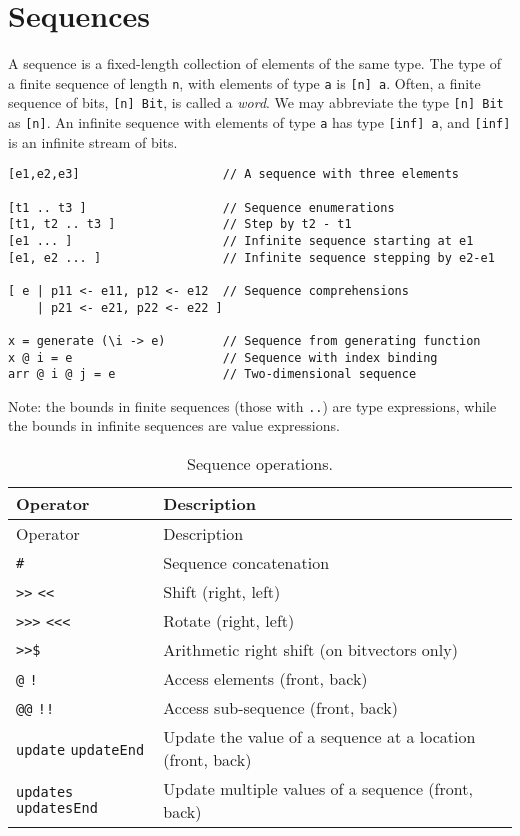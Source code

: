 \hypertarget{sequences}{%
\section{Sequences}\label{sequences}}

A sequence is a fixed-length collection of elements of the same type.
The type of a finite sequence of length \texttt{n}, with elements of
type \texttt{a} is \texttt{{[}n{]}\ a}. Often, a finite sequence of
bits, \texttt{{[}n{]}\ Bit}, is called a \emph{word}. We may abbreviate
the type \texttt{{[}n{]}\ Bit} as \texttt{{[}n{]}}. An infinite sequence
with elements of type \texttt{a} has type \texttt{{[}inf{]}\ a}, and
\texttt{{[}inf{]}} is an infinite stream of bits.

\begin{verbatim}
[e1,e2,e3]                    // A sequence with three elements

[t1 .. t3 ]                   // Sequence enumerations
[t1, t2 .. t3 ]               // Step by t2 - t1
[e1 ... ]                     // Infinite sequence starting at e1
[e1, e2 ... ]                 // Infinite sequence stepping by e2-e1

[ e | p11 <- e11, p12 <- e12  // Sequence comprehensions
    | p21 <- e21, p22 <- e22 ]

x = generate (\i -> e)        // Sequence from generating function
x @ i = e                     // Sequence with index binding
arr @ i @ j = e               // Two-dimensional sequence
\end{verbatim}

Note: the bounds in finite sequences (those with \texttt{..}) are type
expressions, while the bounds in infinite sequences are value
expressions.

\begin{longtable}[]{@{}ll@{}}
\caption{Sequence operations.}\tabularnewline
\toprule
Operator & Description\tabularnewline
\midrule
\endfirsthead
\toprule
Operator & Description\tabularnewline
\midrule
\endhead
\texttt{\#} & Sequence concatenation\tabularnewline
\texttt{\textgreater{}\textgreater{}} \texttt{\textless{}\textless{}} &
Shift (right, left)\tabularnewline
\texttt{\textgreater{}\textgreater{}\textgreater{}}
\texttt{\textless{}\textless{}\textless{}} & Rotate (right,
left)\tabularnewline
\texttt{\textgreater{}\textgreater{}\$} & Arithmetic right shift (on
bitvectors only)\tabularnewline
\texttt{@} \texttt{!} & Access elements (front, back)\tabularnewline
\texttt{@@} \texttt{!!} & Access sub-sequence (front,
back)\tabularnewline
\texttt{update} \texttt{updateEnd} & Update the value of a sequence at a
location (front, back)\tabularnewline
\texttt{updates} \texttt{updatesEnd} & Update multiple values of a
sequence (front, back)\tabularnewline
\bottomrule
\end{longtable}

